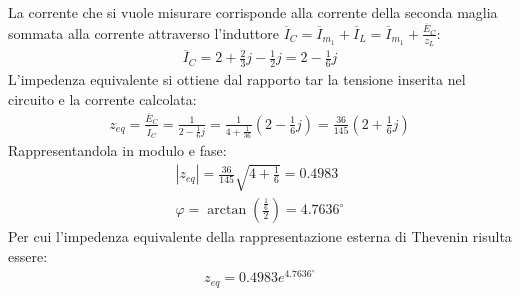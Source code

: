 \documentclass{article}
\begin{document}
La corrente che si vuole misurare corrisponde alla corrente della seconda maglia sommata alla corrente 
attraverso l'induttore $\overline{I}_C=\overline{I}_{m_1}+\overline{I}_L=\overline{I}_{m_1}+\frac{\overline{E}_C}{z_L}$:
\begin{gather*}
    \overline{I}_C=2+\displaystyle\frac{2}{3}j-\frac{1}{2}j=2-\frac{1}{6}j
\end{gather*}
L'impedenza equivalente si ottiene dal rapporto tar la tensione inserita nel circuito e la corrente calcolata:
\begin{gather*}
    z_{eq}=\displaystyle\frac{\overline{E}_C}{\overline{I}_C}=\frac{1}{2-\frac{1}{6}j}=\frac{1}{4+\frac{1}{36}}\left(2-\frac{1}{6}j\right)=\frac{36}{145}\left(2+\frac{1}{6}j\right)
\end{gather*}
Rappresentandola in modulo e fase:
\begin{gather*}
    |z_{eq}|=\displaystyle\frac{36}{145}\sqrt{4+\frac{1}{6}}=0.4983\\
    \varphi=\arctan\left(\frac{\frac{1}{6}}{2}\right)=4.7636^{\circ}
\end{gather*}
Per cui l'impedenza equivalente della rappresentazione esterna di Thevenin risulta essere:
\begin{gather}
    z_{eq}=0.4983e^{4.7636^{\circ}}
\end{gather}
\end{document}
